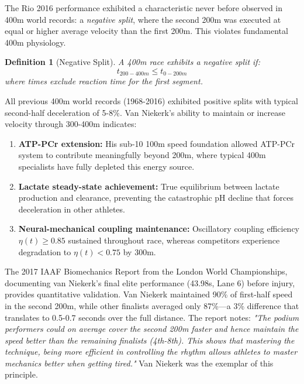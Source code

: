 \documentclass[twocolumn,10pt]{article}
\newtheorem{definition}{Definition}
\begin{document}
The Rio 2016 performance exhibited a characteristic never before observed in 400m world records: a \textit{negative split}, where the second 200m was executed at equal or higher average velocity than the first 200m. This violates fundamental 400m physiology.

\begin{definition}[Negative Split]
A 400m race exhibits a negative split if:
\begin{equation}
t_{200-400m} \leq t_{0-200m}
\end{equation}
where times exclude reaction time for the first segment.
\end{definition}

All previous 400m world records (1968-2016) exhibited positive splits with typical second-half deceleration of 5-8\%. Van Niekerk's ability to maintain or increase velocity through 300-400m indicates:

\begin{enumerate}
    \item \textbf{ATP-PCr extension:} His sub-10 100m speed foundation allowed ATP-PCr system to contribute meaningfully beyond 200m, where typical 400m specialists have fully depleted this energy source.

    \item \textbf{Lactate steady-state achievement:} True equilibrium between lactate production and clearance, preventing the catastrophic pH decline that forces deceleration in other athletes.

    \item \textbf{Neural-mechanical coupling maintenance:} Oscillatory coupling efficiency $\eta(t) \geq 0.85$ sustained throughout race, whereas competitors experience degradation to $\eta(t) < 0.75$ by 300m.
\end{enumerate}

The 2017 IAAF Biomechanics Report from the London World Championships, documenting van Niekerk's final elite performance (43.98s, Lane 6) before injury, provides quantitative validation. Van Niekerk maintained 90\% of first-half speed in the second 200m, while other finalists averaged only 87\%—a 3\% difference that translates to 0.5-0.7 seconds over the full distance. The report notes: \textit{"The podium performers could on average cover the second 200m faster and hence maintain the speed better than the remaining finalists (4th-8th). This shows that mastering the technique, being more efficient in controlling the rhythm allows athletes to master mechanics better when getting tired."} Van Niekerk was the exemplar of this principle.
\end{document}
